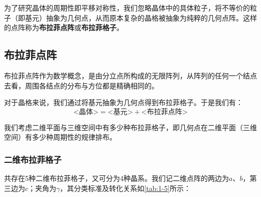     为了研究晶体的周期性即平移对称性，我们忽略晶体中的具体粒子，将不等价的粒子（即基元）抽象为几何点，从而原本复杂的晶格被抽象为纯粹的几何点阵。这样的点阵称为\textbf{布拉菲点阵}或\textbf{布拉菲格子}。

\subsection{布拉菲点阵}
    布拉菲点阵作为数学概念，是由分立点所构成的无限阵列，从阵列的任何一个结点去看，周围各结点的分布与方位都是精确相同的。

    对于晶格来说，我们通过将基元抽象为几何点得到布拉菲格子。于是我们有：
    \[
        \mbox{<晶体>}=\mbox{<基元>}+\mbox{<布拉菲点阵>}
    \]
    
    我们考虑二维平面与三维空间中有多少种布拉菲格子，即几何点在二维平面（三维空间）有多少种周期性的规律排布。

\subsubsection{二维布拉菲格子}
    共存在5种二维布拉菲格子，又可分为4种晶系。我们记二维点阵的两边为$a$、$b$，第三边为$c$；夹角为$\gamma$，其分类标准及转化关系如\autoref{tab:1-5}所示：

    \begin{table}[!htbp]
        \centering
        \caption{二维布拉菲格子}
        \label{tab:1-5}
    \end{table}

